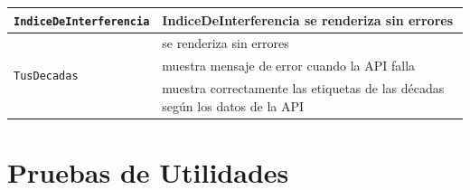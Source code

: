 \begin{longtable}{|p{5cm}|p{9cm}|}
    \multirow{1}{*}{\texttt{IndiceDeInterferencia}} & IndiceDeInterferencia se renderiza sin errores                               \\ \hline

    \multirow{3}{*}{\texttt{TusDecadas}}            & se renderiza sin errores                                                     \\ \cline{2-2}
                                                    & muestra mensaje de error cuando la API falla                                 \\ \cline{2-2}
                                                    & muestra correctamente las etiquetas de las décadas según los datos de la API \\ \hline
\end{longtable}

\section{Pruebas de Utilidades}

